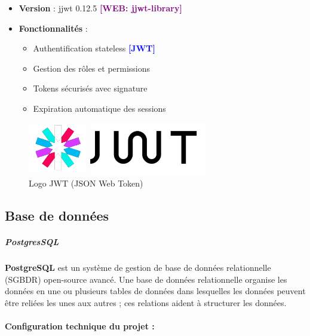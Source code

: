 \documentclass[12pt,a4paper,twoside,openright]{report}
\newcommand{\toabbrev}[1]{\textcolor{blue}{\textbf{[#1]}}}
\newcommand{\webref}[1]{\textcolor{purple}{\textbf{[WEB: #1]}}}
\begin{document}
\begin{itemize}
\item
  \textbf{Version} : jjwt 0.12.5 \webref{jjwt-library}
\item
  \textbf{Fonctionnalités} :

  \begin{itemize}
  \item
    Authentification stateless \toabbrev{JWT}
  \item
    Gestion des rôles et permissions
  \item
    Tokens sécurisés avec signature
  \item
    Expiration automatique des sessions
  \end{itemize}
\end{itemize}

\begin{figure}[H]
\centering
\includegraphics[width=0.7\textwidth]{latex_media/media/image25.png}
\caption{Logo JWT (JSON Web Token)}
\label{fig:logo-jwt}
\end{figure}

\hypertarget{base-de-donnuxe9es}{%
\subsection{\texorpdfstring{Base de données
}{Base de données }}\label{base-de-donnuxe9es}}

\hypertarget{postgressql}{%
\subparagraph{\texorpdfstring{\textbf{PostgresSQL}~}{PostgresSQL~}}\label{postgressql}}

\textbf{PostgreSQL} est un système de gestion de base de données
relationnelle (SGBDR) open-source avancé. Une base de données
relationnelle organise les données en une ou plusieurs tables de données
dans lesquelles les données peuvent être reliées les unes aux autres ;
ces relations aident à structurer les données.

\hypertarget{configuration-technique-du-projet-3}{%
\paragraph{\texorpdfstring{\textbf{Configuration technique du projet
:}}{Configuration technique du projet :}}\label{configuration-technique-du-projet-3}}
\end{document}
